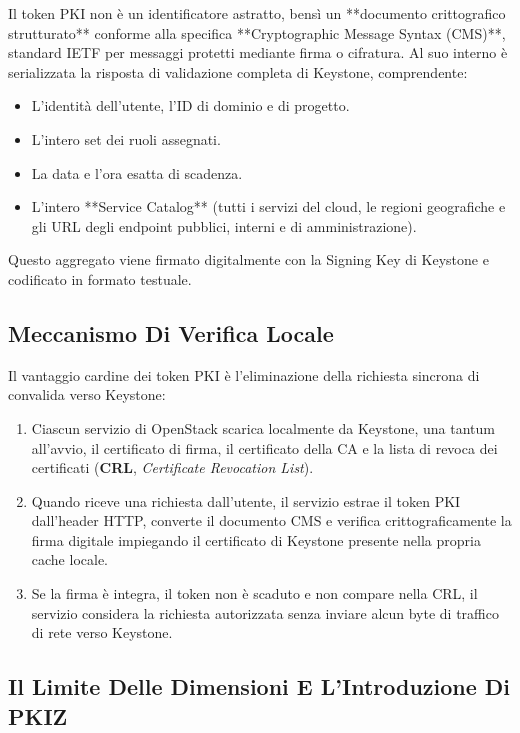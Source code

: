 \documentclass[11pt, a4paper]{article}
\begin{document}
Il token PKI non è un identificatore astratto, bensì un **documento crittografico strutturato** conforme alla specifica **Cryptographic Message Syntax (CMS)**, standard IETF per messaggi protetti mediante firma o cifratura. Al suo interno è serializzata la risposta di validazione completa di Keystone, comprendente:
\begin{itemize}[noitemsep]
    \item L'identità dell'utente, l'ID di dominio e di progetto.
    \item L'intero set dei ruoli assegnati.
    \item La data e l'ora esatta di scadenza.
    \item L'intero **Service Catalog** (tutti i servizi del cloud, le regioni geografiche e gli URL degli endpoint pubblici, interni e di amministrazione).
\end{itemize}

Questo aggregato viene firmato digitalmente con la Signing Key di Keystone e codificato in formato testuale.

\subsection{Meccanismo Di Verifica Locale}

Il vantaggio cardine dei token PKI è l'eliminazione della richiesta sincrona di convalida verso Keystone:
\begin{enumerate}
    \item Ciascun servizio di OpenStack scarica localmente da Keystone, una tantum all'avvio, il certificato di firma, il certificato della CA e la lista di revoca dei certificati (\textbf{CRL}, \emph{Certificate Revocation List}).
    \item Quando riceve una richiesta dall'utente, il servizio estrae il token PKI dall'header HTTP, converte il documento CMS e verifica crittograficamente la firma digitale impiegando il certificato di Keystone presente nella propria cache locale.
    \item Se la firma è integra, il token non è scaduto e non compare nella CRL, il servizio considera la richiesta autorizzata senza inviare alcun byte di traffico di rete verso Keystone.
\end{enumerate}

\subsection{Il Limite Delle Dimensioni E L'Introduzione Di PKIZ}
\end{document}
